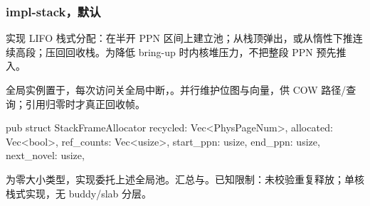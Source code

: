 
\subsubsection{impl-stack，默认}

实现 LIFO 栈式分配：在半开 PPN 区间上建立池；从栈顶弹出，或从惰性下推连续高段；压回回收栈。为降低 bring-up 时内核堆压力，不把整段 PPN 预先推入。

全局实例置于，每次访问关全局中断，。并行维护位图与向量，供 COW 路径/查询；引用归零时才真正回收帧。

\begin{rustcode}
pub struct StackFrameAllocator {
    recycled: Vec<PhysPageNum>,
    allocated: Vec<bool>,
    ref_counts: Vec<usize>,
    start_ppn: usize,
    end_ppn: usize,
    next_novel: usize,
}
\end{rustcode}

为零大小类型，实现委托上述全局池。汇总与。已知限制：未校验重复释放；单核栈式实现，无 buddy/slab 分层。
